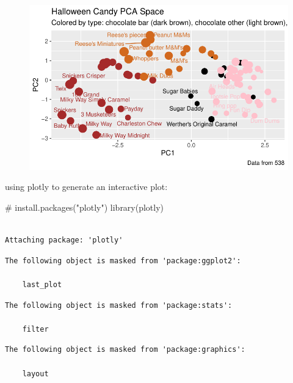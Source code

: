 \documentclass[
  letterpaper,
  DIV=11,
  numbers=noendperiod]{scrartcl}
\newenvironment{Shaded}{\begin{snugshade}}{\end{snugshade}}
\newcommand{\CommentTok}[1]{\textcolor[rgb]{0.37,0.37,0.37}{#1}}
\newcommand{\FunctionTok}[1]{\textcolor[rgb]{0.28,0.35,0.67}{#1}}
\newcommand{\NormalTok}[1]{\textcolor[rgb]{0.00,0.23,0.31}{#1}}
\begin{document}
\begin{figure}[H]

{\centering \includegraphics{class10_project_files/figure-pdf/unnamed-chunk-23-1.pdf}

}

\end{figure}

using plotly to generate an interactive plot:

\begin{Shaded}
\begin{Highlighting}[]
\CommentTok{\# install.packages("plotly")}
\FunctionTok{library}\NormalTok{(plotly)}
\end{Highlighting}
\end{Shaded}

\begin{verbatim}

Attaching package: 'plotly'
\end{verbatim}

\begin{verbatim}
The following object is masked from 'package:ggplot2':

    last_plot
\end{verbatim}

\begin{verbatim}
The following object is masked from 'package:stats':

    filter
\end{verbatim}

\begin{verbatim}
The following object is masked from 'package:graphics':

    layout
\end{verbatim}
\end{document}
